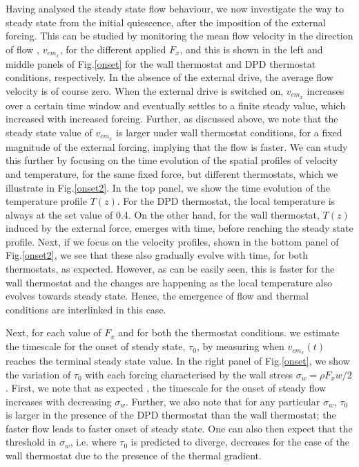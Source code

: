 Having analysed the steady state flow behaviour, we now investigate the way to steady state from the initial quiescence, after the imposition of the external forcing. This can be studied by monitoring the mean flow velocity in the direction of flow \cite{pinaki2014}, $v_{cm_x}$, for the different applied $F_x$, and this is shown in the left and middle panels of Fig.\ref{onset} for the wall thermostat and DPD thermostat conditions, respectively. In the absence of the external drive, the average flow velocity is of course zero. When the external drive is switched on, $v_{cm_x}$ increases over a certain time window and eventually settles to a finite steady value, which increased with increased forcing. Further, as discussed above, we note that the steady state value of $v_{cm_x}$ is larger under wall thermostat conditions, for a fixed magnitude of the external forcing, implying that the flow is faster. We can study this further by focusing on the time evolution of the spatial profiles of velocity and temperature, for the same fixed force, but different thermostats, which we illustrate in Fig.\ref{onset2}. In the top panel, we show the time evolution of the temperature profile $T(z)$. For the DPD thermostat, the local temperature is always at the set value of 0.4. On the other hand, for the wall thermostat, $T(z)$ induced by the external force, emerges with time, before reaching the steady state profile.  Next, if we focus on the velocity profiles, shown in the bottom panel of  Fig.\ref{onset2}, we see that these also gradually evolve with time, for both thermostats, as expected. However, as can be easily seen, this is faster for the wall thermostat and the changes are happening as the local temperature also evolves towards steady state. Hence, the emergence of flow and thermal conditions are interlinked in this case.

Next, for each value of $F_x$ and for both the thermostat conditions. we estimate the timescale for the onset of steady state, $\tau_0$, by measuring when $v_{cm_x}(t)$ reaches the terminal steady state value. In the right panel of Fig.\ref{onset}, we show the variation of $\tau_0$ with each forcing characterised by the wall stress $\sigma_w=\rho{F_x}w/2$. First, we note that as expected \cite{pinaki2014}, the timescale for the onset of steady flow increases with decreasing $\sigma_w$. Further, we also note that for any particular $\sigma_w$, $\tau_0$ is larger in the presence of the DPD thermostat than the wall thermostat; the faster flow leads to faster onset of steady state. One can also then expect that the threshold in  $\sigma_w$, i.e. where $\tau_0$ is predicted to diverge, decreases for the case of the wall thermostat due to the presence of the thermal gradient.



